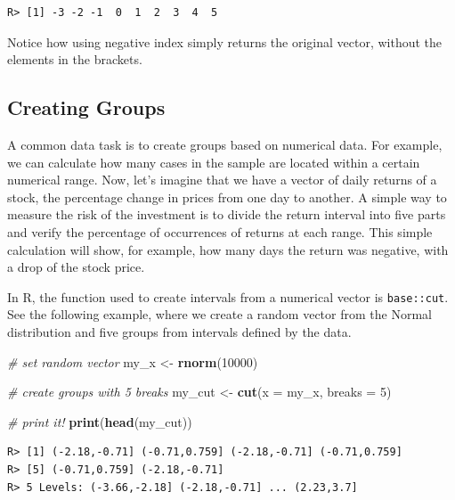 \documentclass[
  12pt,
]{book}
\newenvironment{Shaded}{\begin{snugshade}}{\end{snugshade}}
\newcommand{\CommentTok}[1]{\textcolor[rgb]{0.37,0.37,0.37}{\textit{#1}}}
\newcommand{\DataTypeTok}[1]{\textcolor[rgb]{0.27,0.27,0.27}{#1}}
\newcommand{\DecValTok}[1]{\textcolor[rgb]{0.06,0.06,0.06}{#1}}
\newcommand{\KeywordTok}[1]{\textcolor[rgb]{0.27,0.27,0.27}{\textbf{#1}}}
\newcommand{\NormalTok}[1]{#1}
\newcommand{\StringTok}[1]{\textcolor[rgb]{0.5,0.5,0.5}{#1}}
\begin{document}
\begin{verbatim}
R> [1] -3 -2 -1  0  1  2  3  4  5
\end{verbatim}

Notice how using negative index simply returns the original vector, without the elements in the brackets.

\hypertarget{creating-groups}{%
\subsection{Creating Groups}\label{creating-groups}}

A common data task is to create groups based on numerical data. For example, we can calculate how many cases in the sample are located within a certain numerical range. Now, let's imagine that we have a vector of daily returns of a stock, the percentage change in prices from one day to another. A simple way to measure the risk of the investment is to divide the return interval into five parts and verify the percentage of occurrences of returns at each range. This simple calculation will show, for example, how many days the return was negative, with a drop of the stock price.

In R, the function used to create intervals from a numerical vector is \texttt{base::cut}. See the following example, where we create a random vector from the Normal distribution and five groups from intervals defined by the data. 

\begin{Shaded}
\begin{Highlighting}[]
\CommentTok{# set random vector}
\NormalTok{my_x <-}\StringTok{ }\KeywordTok{rnorm}\NormalTok{(}\DecValTok{10000}\NormalTok{)}

\CommentTok{# create groups with 5 breaks}
\NormalTok{my_cut <-}\StringTok{ }\KeywordTok{cut}\NormalTok{(}\DataTypeTok{x =}\NormalTok{ my_x, }\DataTypeTok{breaks =} \DecValTok{5}\NormalTok{)}

\CommentTok{# print it!}
\KeywordTok{print}\NormalTok{(}\KeywordTok{head}\NormalTok{(my_cut))}
\end{Highlighting}
\end{Shaded}

\begin{verbatim}
R> [1] (-2.18,-0.71] (-0.71,0.759] (-2.18,-0.71] (-0.71,0.759]
R> [5] (-0.71,0.759] (-2.18,-0.71]
R> 5 Levels: (-3.66,-2.18] (-2.18,-0.71] ... (2.23,3.7]
\end{verbatim}
\end{document}
